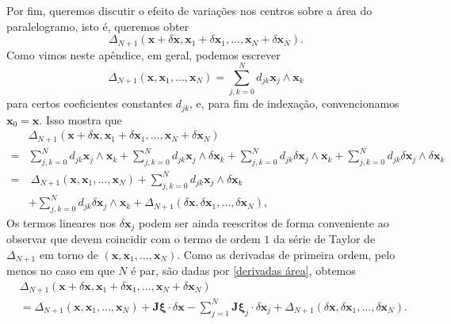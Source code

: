 \documentclass[
	12pt,
	oneside,			%
	a4paper,			%
	english,			%
	brazil				%
	]{abntex2}
\theoremstyle{definition}
\begin{document}
\begin{apendicesenv}
Por fim, queremos discutir o efeito de variações nos centros sobre a área do paralelogramo, isto é, queremos obter
\begin{equation}
    \Delta_{N+1}\left(\mathbf{x} + \delta\mathbf{x},\mathbf{x}_1+\delta\mathbf{x}_1,\ldots,\mathbf{x}_{N}+\delta\mathbf{x}_N\right).
\end{equation}
Como vimos neste apêndice, em geral, podemos escrever
\begin{equation}
    \Delta_{N+1}\left(\mathbf{x},\mathbf{x}_1,\ldots,\mathbf{x}_{N}\right) = \sum_{j,k=0}^N d_{jk} \mathbf{x}_j \wedge \mathbf{x}_k
\end{equation}
para certos coeficientes constantes $d_{jk}$, e, para fim de indexação, convencionamos $\mathbf{x}_0 = \mathbf{x}$. Isso mostra que
\begin{equation}
    \begin{aligned}
        &\Delta_{N+1}\left(\mathbf{x} + \delta\mathbf{x},\mathbf{x}_1+\delta\mathbf{x}_1,\ldots,\mathbf{x}_{N}+\delta\mathbf{x}_N\right)\\  =& \sum_{j,k=0}^N d_{jk} \mathbf{x}_j \wedge \mathbf{x}_k + \sum_{j,k=0}^N d_{jk} \mathbf{x}_j \wedge \delta\mathbf{x}_k + \sum_{j,k=0}^N d_{jk} \delta\mathbf{x}_j \wedge \mathbf{x}_k + \sum_{j,k=0}^N d_{jk} \delta\mathbf{x}_j \wedge \delta\mathbf{x}_k \\ =& \ \Delta_{N+1}\left(\mathbf{x},\mathbf{x}_1,\ldots,\mathbf{x}_{N}\right)  + \sum_{j,k=0}^N d_{jk} \mathbf{x}_j \wedge \delta\mathbf{x}_k \\ &+ \sum_{j,k=0}^N d_{jk} \delta\mathbf{x}_j \wedge \mathbf{x}_k + \Delta_{N+1}\left( \delta\mathbf{x},\delta\mathbf{x}_1,\ldots,\delta\mathbf{x}_N\right),
    \end{aligned}
\end{equation}
Os termos lineares nos $\delta \mathbf{x}_j$ podem ser ainda reescritos de forma conveniente ao observar que devem coincidir com o termo de ordem $1$ da série de Taylor de $\Delta_{N+1}$ em torno de $\left(\mathbf{x},\mathbf{x}_1,\ldots,\mathbf{x}_{N}\right)$. Como as derivadas de primeira ordem, pelo menos no caso em que $N$ é par, são dadas por \eqref{derivadas área}, obtemos
\begin{equation}
    \label{variação área}
    \begin{aligned}
        &\Delta_{N+1}\left(\mathbf{x} + \delta\mathbf{x},\mathbf{x}_1+\delta\mathbf{x}_1,\ldots,\mathbf{x}_{N}+\delta\mathbf{x}_N\right) \\
    &=\Delta_{N+1}\left(\mathbf{x},\mathbf{x}_1,\ldots,\mathbf{x}_{N}\right)  + \mathbf{J} \boldsymbol{\xi} \cdot \delta\mathbf{x}  - \sum_{j=1}^N \mathbf{J} \boldsymbol{\xi}_j \cdot \delta\mathbf{x}_j  + \Delta_{N+1}\left( \delta\mathbf{x},\delta\mathbf{x}_1,\ldots,\delta\mathbf{x}_N\right).
    \end{aligned}
\end{equation}


\end{apendicesenv}
\end{document}
